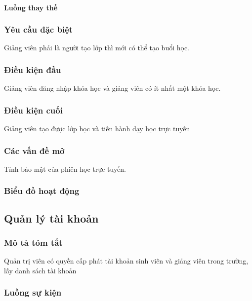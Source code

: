 \documentclass[./../main_file.tex]{subfiles}
\begin{document}
\paragraph{Luồng thay thế}
\subsubsection{Yêu cầu đặc biệt}
Giảng viên phải là người tạo lớp thì mới có thể tạo buổi học.

\subsubsection{Điều kiện đầu}
Giảng viên đăng nhập khóa học và giảng viên có ít nhất một khóa học.

\subsubsection{Điều kiện cuối}
Giảng viên tạo được lớp học và tiến hành dạy học trực tuyến


\subsubsection{Các vấn đề mở}
Tính bảo mật của phiên học trực tuyến.

\subsubsection{Biểu đồ hoạt động}

\subsection{Quản lý tài khoản}
\subsubsection{Mô tả tóm tắt}
Quản trị viên có quyền cấp phát tài khoản sinh viên và giảng viên trong trường, lấy danh sách tài khoản

\subsubsection{Luồng sự kiện}
\end{document}
